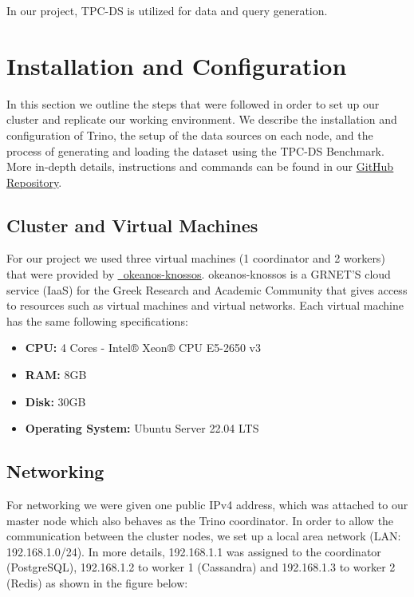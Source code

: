 \documentclass[conference]{IEEEtran}
\begin{document}
In our project, TPC-DS is utilized for data and query generation.

\section{Installation and Configuration}

In this section we outline the steps that were followed in order to set up our cluster and replicate our working
environment. We describe the installation and configuration of Trino, the setup of the data sources 
on each node, and the process of generating and loading the dataset using the TPC-DS Benchmark. 
More in-depth details, instructions and commands can be found in our \textcolor{linkblue}{\underline{\href{https://github.com/alex1on/Information-Systems-NTUA}{GitHub Repository}}}.
\subsection{Cluster and Virtual Machines}

For our project we used three virtual machines (1 coordinator and 2 workers) that were provided by \textcolor{linkblue}{\underline{\href{https://okeanos-knossos.grnet.gr/home/}{~okeanos-knossos}}}.
okeanos-knossos is a GRNET'S cloud service (IaaS) for the Greek Research and Academic Community that gives access to resources such as 
virtual machines and virtual networks. Each virtual machine has the same following specifications:

\begin{itemize}
    \item \textbf{CPU:} 4 Cores - Intel® Xeon® CPU E5-2650 v3
    \item \textbf{RAM:} 8GB
    \item \textbf{Disk:} 30GB
    \item \textbf{Operating System:} Ubuntu Server 22.04 LTS
\end{itemize}

\subsection{Networking}

For networking we were given one public IPv4 address, which was attached to our master node which also behaves as the Trino coordinator.
In order to allow the communication between the cluster nodes, we set up a local area network (LAN: 192.168.1.0/24). In more details,
192.168.1.1 was assigned to the coordinator (PostgreSQL), 192.168.1.2 to worker 1 (Cassandra) and 192.168.1.3 to worker 2 (Redis)
as shown in the figure below:
\end{document}
